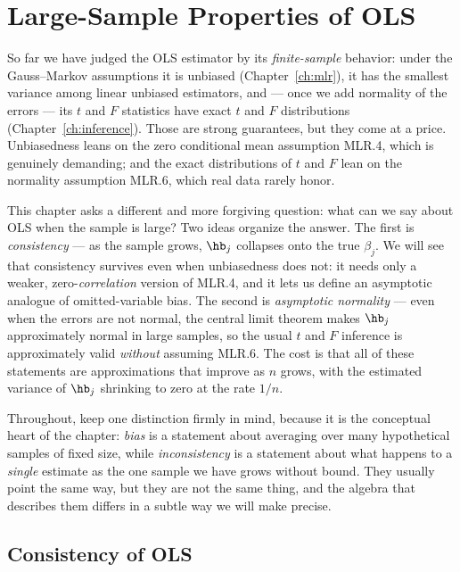 \chapter{Large-Sample Properties of OLS}
\label{ch:asymptotics}

So far we have judged the OLS estimator by its \emph{finite-sample} behavior: under the Gauss--Markov assumptions it is unbiased (Chapter~\ref{ch:mlr}), it has the smallest variance among linear unbiased estimators, and --- once we add normality of the errors --- its $t$ and $F$ statistics have exact $t$ and $F$ distributions (Chapter~\ref{ch:inference}). Those are strong guarantees, but they come at a price. Unbiasedness leans on the zero conditional mean assumption MLR.4, which is genuinely demanding; and the exact distributions of $t$ and $F$ lean on the normality assumption MLR.6, which real data rarely honor.

This chapter asks a different and more forgiving question: what can we say about OLS when the sample is large? Two ideas organize the answer. The first is \emph{consistency} --- as the sample grows, $\hb_j$ collapses onto the true $\beta_j$. We will see that consistency survives even when unbiasedness does not: it needs only a weaker, zero-\emph{correlation} version of MLR.4, and it lets us define an asymptotic analogue of omitted-variable bias. The second is \emph{asymptotic normality} --- even when the errors are not normal, the central limit theorem makes $\hb_j$ approximately normal in large samples, so the usual $t$ and $F$ inference is approximately valid \emph{without} assuming MLR.6. The cost is that all of these statements are approximations that improve as $n$ grows, with the estimated variance of $\hb_j$ shrinking to zero at the rate $1/n$.

Throughout, keep one distinction firmly in mind, because it is the conceptual heart of the chapter: \emph{bias} is a statement about averaging over many hypothetical samples of fixed size, while \emph{inconsistency} is a statement about what happens to a \emph{single} estimate as the one sample we have grows without bound. They usually point the same way, but they are not the same thing, and the algebra that describes them differs in a subtle way we will make precise.

\section{Consistency of OLS}

